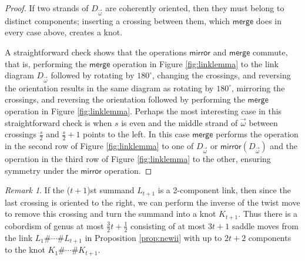 \documentclass[12pt]{amsart}
\theoremstyle{definition}
\theoremstyle{remark}
\newtheorem{remark}[theorem]{Remark}
\numberwithin{equation}{section}
\def\red{\color{red}}
\newcommand{\mirror}{\textsf{mirror}}
\newcommand{\merge}{\textsf{merge}}
\begin{document}
\begin{proof}
If two strands of $D_{\vec{\omega}}$ are coherently oriented, then they must belong to distinct components; inserting a crossing between them, which $\merge$ does in every case above, creates a knot.

A straightforward check shows that the operations $\mirror$ and $\merge$ commute, that is, performing the $\merge$ operation in Figure \ref{fig:linklemma} to the link diagram $D_{\vec{\omega}}$ followed by rotating by $180^\circ$, changing the crossings, and reversing the orientation results in the same diagram as rotating by $180^\circ$, mirroring the crossings, and reversing the orientation followed by performing the $\merge$ operation in Figure \ref{fig:linklemma}. Perhaps the most interesting case in this straightforward check is when $s$ is even and the middle strand of $\vec{\omega}$ between crossings $\frac{s}{2}$ and $\frac{s}{2}+1$ points to the left. In this case $\merge$ performs the operation in the second row of Figure \ref{fig:linklemma} to one of $D_{\vec{\omega}}$ or $\mirror(D_{\vec{\omega}})$ and the operation in the third row of Figure \ref{fig:linklemma} to the other, ensuring symmetry under the $\mirror$ operation.
\end{proof}


\begin{remark}
\label{rem:link}
If the ($t+1$)st summand $L_{t+1}$ is a 2-component link, then since the last crossing is oriented to the right, we can perform the inverse of the twist move to remove this crossing and turn the summand into a knot $K_{t+1}$. Thus there is a cobordism of genus at most $\frac{3}{2}t + \frac{1}{2}$ consisting of at most $3t+1$ saddle moves from the link $L_1\#\cdots \#L_{t+1}$ in Proposition \ref{prop:newii} with up to $2t+2$ components to the knot $K_1\#\cdots \#K_{t+1}$.



\end{remark}
\end{document}
